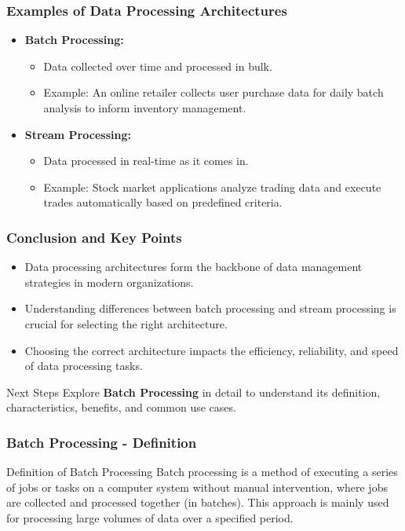 \documentclass[aspectratio=169]{beamer}
\begin{document}
\begin{frame}[fragile]
  \frametitle{Examples of Data Processing Architectures}
  \begin{itemize}
    \item \textbf{Batch Processing:}
      \begin{itemize}
        \item Data collected over time and processed in bulk.
        \item Example: An online retailer collects user purchase data for daily batch analysis to inform inventory management.
      \end{itemize}
    
    \item \textbf{Stream Processing:}
      \begin{itemize}
        \item Data processed in real-time as it comes in.
        \item Example: Stock market applications analyze trading data and execute trades automatically based on predefined criteria.
      \end{itemize}
  \end{itemize}
\end{frame}

\begin{frame}[fragile]
  \frametitle{Conclusion and Key Points}
  \begin{itemize}
    \item Data processing architectures form the backbone of data management strategies in modern organizations.
    \item Understanding differences between batch processing and stream processing is crucial for selecting the right architecture.
    \item Choosing the correct architecture impacts the efficiency, reliability, and speed of data processing tasks.
  \end{itemize}
  
  \begin{block}{Next Steps}
    Explore \textbf{Batch Processing} in detail to understand its definition, characteristics, benefits, and common use cases.
  \end{block}
\end{frame}

\begin{frame}[fragile]
    \frametitle{Batch Processing - Definition}
    \begin{block}{Definition of Batch Processing}
        Batch processing is a method of executing a series of jobs or tasks on a computer system without manual intervention, where jobs are collected and processed together (in batches). This approach is mainly used for processing large volumes of data over a specified period.
    \end{block}
\end{frame}
\end{document}
